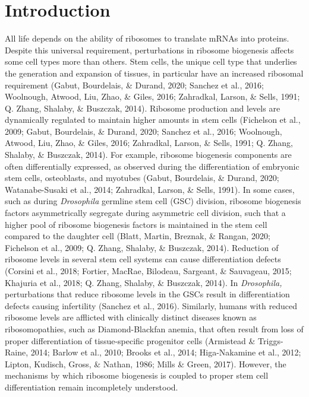 \documentclass[12pt,oneside]{reedthesis}
\begin{document}
\hypertarget{introduction-1}{%
\section{Introduction}\label{introduction-1}}

All life depends on the ability of ribosomes to translate mRNAs into proteins. Despite this universal requirement, perturbations in ribosome biogenesis affects some cell types more than others. Stem cells, the unique cell type that underlies the generation and expansion of tissues, in particular have an increased ribosomal requirement (Gabut, Bourdelais, \& Durand, 2020; Sanchez et al., 2016; Woolnough, Atwood, Liu, Zhao, \& Giles, 2016; Zahradkal, Larson, \& Sells, 1991; Q. Zhang, Shalaby, \& Buszczak, 2014). Ribosome production and levels are dynamically regulated to maintain higher amounts in stem cells (Fichelson et al., 2009; Gabut, Bourdelais, \& Durand, 2020; Sanchez et al., 2016; Woolnough, Atwood, Liu, Zhao, \& Giles, 2016; Zahradkal, Larson, \& Sells, 1991; Q. Zhang, Shalaby, \& Buszczak, 2014). For example, ribosome biogenesis components are often differentially expressed, as observed during the differentiation of embryonic stem cells, osteoblasts, and myotubes (Gabut, Bourdelais, \& Durand, 2020; Watanabe-Susaki et al., 2014; Zahradkal, Larson, \& Sells, 1991). In some cases, such as during \emph{Drosophila} germline stem cell (GSC) division, ribosome biogenesis factors asymmetrically segregate during asymmetric cell division, such that a higher pool of ribosome biogenesis factors is maintained in the stem cell compared to the daughter cell (Blatt, Martin, Breznak, \& Rangan, 2020; Fichelson et al., 2009; Q. Zhang, Shalaby, \& Buszczak, 2014). Reduction of ribosome levels in several stem cell systems can cause differentiation defects (Corsini et al., 2018; Fortier, MacRae, Bilodeau, Sargeant, \& Sauvageau, 2015; Khajuria et al., 2018; Q. Zhang, Shalaby, \& Buszczak, 2014). In \emph{Drosophila,} perturbations that reduce ribosome levels in the GSCs result in differentiation defects causing infertility (Sanchez et al., 2016). Similarly, humans with reduced ribosome levels are afflicted with clinically distinct diseases known as ribosomopathies, such as Diamond-Blackfan anemia, that often result from loss of proper differentiation of tissue-specific progenitor cells (Armistead \& Triggs-Raine, 2014; Barlow et al., 2010; Brooks et al., 2014; Higa-Nakamine et al., 2012; Lipton, Kudisch, Gross, \& Nathan, 1986; Mills \& Green, 2017). However, the mechanisms by which ribosome biogenesis is coupled to proper stem cell differentiation remain incompletely understood.
\end{document}
